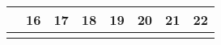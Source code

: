 {\begin{tabularx}{\linewidth}{|l!{\vrule width \myLenLineThicknessThick}*{7}{@{}X@{}|}}
      
        \\  \hline 
      
    
  
  
  
  \hyperlink{week-2026-46}{} &
    
      
      
        \begin{minipage}[t]{6mm}\centering{}16\end{minipage}
      
       & 
    
      
      
        \begin{minipage}[t]{6mm}\centering{}17\end{minipage}
      
       & 
    
      
      
        \begin{minipage}[t]{6mm}\centering{}18\end{minipage}
      
       & 
    
      
      
        \begin{minipage}[t]{6mm}\centering{}19\end{minipage}
      
       & 
    
      
      
        \begin{minipage}[t]{6mm}\centering{}20\end{minipage}
      
       & 
    
      
      
        \begin{minipage}[t]{6mm}\centering{}21\end{minipage}
      
       & 
    
      
      
        \begin{minipage}[t]{6mm}\centering{}22\end{minipage}
      
      
        \\  \hline 
      
    
  
  
  
  \hyperlink{week-2026-47}{} &
    

\end{tabularx}}
